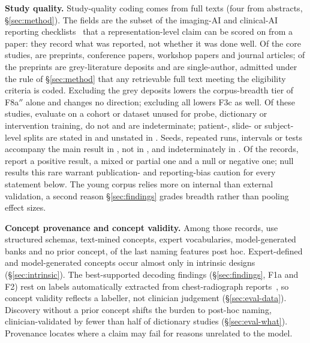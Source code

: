 \textbf{Study quality.} Study-quality coding comes from full texts (four from abstracts,
\S\ref{sec:method}). The fields are the subset of the imaging-AI and clinical-AI reporting
checklists~\cite{mongan2020claim,norgeot2020minimum} that a representation-level claim can be scored on from a paper: they
record what was reported, not whether it was done well.
Of the \Ncore{} core studies, \Npreprint{} are preprints, \Nconf{} conference
papers, \Nwork{} workshop papers and \Njour{} journal articles; \Ngrey{} of the preprints are grey-literature deposits and
\Nsingle{} are single-author, admitted under the rule of \S\ref{sec:method} that any retrievable full text meeting the eligibility criteria is coded. Excluding the
grey deposits lowers the corpus-breadth tier of F8a$''$ alone and changes no direction; excluding all \Ngreysingle{} lowers F3c as well. Of these studies, \Nextyes{} evaluate on a cohort or
dataset unused for probe, dictionary or intervention training, \Nextno{} do not and \Nextunk{} are
indeterminate;
patient-, slide- or subject-level splits are stated in \Nsplityes{} and unstated in \Nsplitno{}. Seeds,
repeated runs, intervals or tests accompany the main result in \Nseedyes{}, not in \Nseedno{}, and
indeterminately in \Nseedunk{}. Of the \Nclaims{} records, \Ndirpos{} report a positive result,
\Ndirmix{} a mixed or partial one and \Ndirnull{} a null or negative one; null results this rare warrant
publication- and reporting-bias caution for every statement below. The young corpus relies more on internal
than external validation, a second reason \S\ref{sec:findings} grades breadth rather than pooling effect
sizes.

\textbf{Concept provenance and concept validity.} Among those records, \Nprovlabel{} use structured
schemas, \Nprovtext{} text-mined concepts, \Nprovexpert{} expert vocabularies, \Nprovmodel{}
model-generated banks and \Nprovnone{} no prior concept, \Nposthocname{} of the last naming features post
hoc. Expert-defined and model-generated concepts occur almost only in intrinsic designs
(\S\ref{sec:intrinsic}). The best-supported decoding findings (\S\ref{sec:findings}, F1a and F2) rest on
labels automatically extracted from chest-radiograph
reports~\cite{irvin2019chexpert,johnson2019mimicjpg}, so concept validity reflects a labeller, not clinician
judgement (\S\ref{sec:eval-data}). Discovery without a prior concept shifts the burden to post-hoc naming,
clinician-validated by fewer than half of dictionary studies (\S\ref{sec:eval-what}). Provenance locates where a claim may fail for reasons unrelated to the model.

